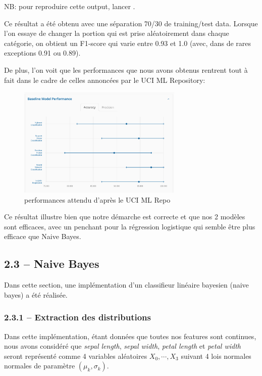 \documentclass[
]{article}
\begin{document}
NB: pour reproduire cette output, lancer .

Ce résultat a été obtenu avec une séparation 70/30 de training/test
data. Lorsque l'on essaye de changer la portion qui est prise
aléatoirement dans chaque catégorie, on obtient un F1-score qui varie
entre 0.93 et 1.0 (avec, dans de rares exceptions 0.91 ou 0.89).

De plus, l'on voit que les performances que nous avons obtenus rentrent
tout à fait dans le cadre de celles annoncées par le UCI ML Repository:

\begin{figure}
\centering
\includegraphics[width=0.7\textwidth,height=\textheight]{../res/screenshot_ucmi_perfs.png}
\caption{performances attendu d'après le UCI ML Repo \cite{IrisWebsite}}
\end{figure}

Ce résultat illustre bien que notre démarche est correcte et que nos 2
modèles sont efficaces, avec un penchant pour la régression logistique
qui semble être plus efficace que Naive Bayes.

\newpage{}

\subsection{2.3 -- Naive Bayes}\label{naive-bayes-1}

Dans cette section, une implémentation d'un classifieur linéaire
bayesien (naive bayes) a été réalisée.

\subsubsection{2.3.1 -- Extraction des
distributions}\label{extraction-des-distributions}

Dans cette implémentation, étant données que toutes nos features sont
continues, nous avons considéré que \emph{sepal length}, \emph{sepal
width}, \emph{petal length} et \emph{petal width} seront représenté
comme 4 variables aléatoires \(X_0, \cdots, X_3\) suivant 4 lois
normales normales de paramètre \((\mu_k, \sigma_k)\).
\end{document}
